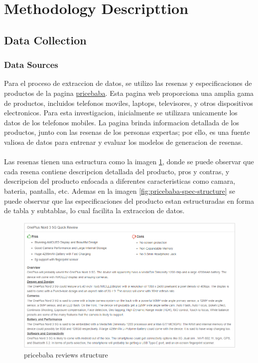 \section{Methodology Descripttion}
\subsection{Data Collection}
\subsubsection{Data Sources}
Para el proceso de extraccion de datos, se utilizo las resenas y especificaciones de productos de la pagina \href{https://pricebaba.com/}{pricebaba}. Esta pagina web proporciona una amplia gama de productos, incluidos telefonos moviles, laptops, televisores, y otros dispositivos electronicos. Para esta investigacion, inicialmente se utilizara unicamente los datos de los telefonos mobiles. La pagina brinda informacion detallada de los productos, junto con las resenas de los personas expertas; por ello, es una fuente valiosa de datos para entrenar y evaluar los modelos de generacion de resenas.
\\\\
Las resenas tienen una estructura como la imagen \ref{fig:pricebaba-review-structure}, donde se puede observar que cada resena contiene descripcion detallada del producto, pros y contras, y descripcion del producto enfocada a diferentes caracteristicas como camara, bateria, pantalla, etc. Ademas en la imagen \ref{fig:pricebaba-spec-structure} se puede observar que las especificaciones del producto estan estructuradas en forma de tabla y subtablas, lo cual facilita la extraccion de datos.
\begin{figure}[H]
    \centering
    \includegraphics[width=12cm]{images/pricebaba_review_structure.png}
    \caption{pricebaba reviews structure}
    \label{fig:pricebaba-review-structure}
\end{figure}
